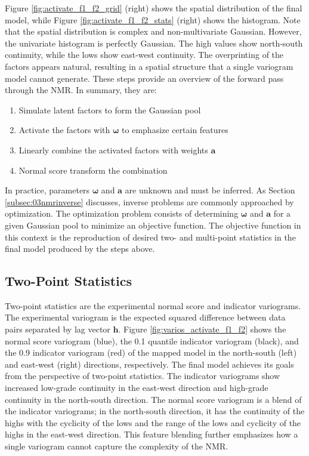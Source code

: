 Figure \ref{fig:activate_f1_f2_grid} (right) shows the spatial distribution of the final model, while Figure \ref{fig:activate_f1_f2_stats} (right) shows the histogram. Note that the spatial distribution is complex and non-multivariate Gaussian. However, the univariate histogram is perfectly Gaussian. The high values show north-south continuity, while the lows show east-west continuity. The overprinting of the factors appears natural, resulting in a spatial structure that a single variogram model cannot generate. These steps provide an overview of the forward pass through the \gls{NMR}. In summary, they are:
\begin{enumerate}[noitemsep]
    \item Simulate latent factors to form the Gaussian pool
    \item Activate the factors with $\boldsymbol{\omega}$ to emphasize certain features
    \item Linearly combine the activated factors with weights $\mathbf{a}$
    \item Normal score transform the combination
\end{enumerate}

In practice, parameters $\boldsymbol{\omega}$ and $\mathbf{a}$ are unknown and must be inferred. As Section \ref{subsec:03nmrinverse} discusses, inverse problems are commonly approached by optimization. The optimization problem consists of determining $\boldsymbol{\omega}$ and $\mathbf{a}$ for a given Gaussian pool to minimize an objective function. The objective function in this context is the reproduction of desired two- and multi-point statistics in the final model produced by the steps above.

\FloatBarrier
\subsection{Two-Point Statistics}
\label{subsec:03twopt}

Two-point statistics are the experimental normal score and indicator variograms. The experimental variogram is the expected squared difference between data pairs separated by lag vector $\mathbf{h}$. Figure \ref{fig:varios_activate_f1_f2} shows the normal score variogram (blue), the 0.1 quantile indicator variogram (black), and the 0.9 indicator variogram (red) of the mapped model in the north-south (left) and east-west (right) directions, respectively. The final model achieves its goals from the perspective of two-point statistics. The indicator variograms show increased low-grade continuity in the east-west direction and high-grade continuity in the north-south direction. The normal score variogram is a blend of the indicator variograms; in the north-south direction, it has the continuity of the highs with the cyclicity of the lows and the range of the lows and cyclicity of the highs in the east-west direction. This feature blending further emphasizes how a single variogram cannot capture the complexity of the \gls{NMR}.

